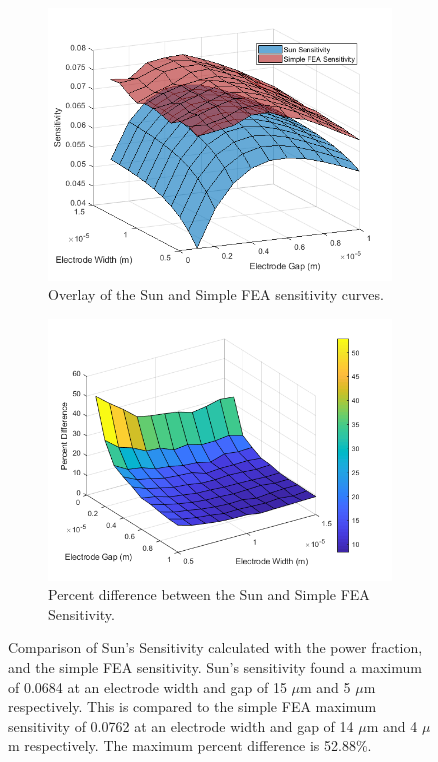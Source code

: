 \begin{figure}[h]
    \centering
    \begin{subfigure}{0.47\textwidth}
        \centering
        \includegraphics[width=\textwidth]{images/SunVsSimpleSensitivity.png}
        \caption{Overlay of the Sun and Simple FEA sensitivity curves.}
    \end{subfigure}
    \hfill
    \begin{subfigure}{0.47\textwidth}
        \centering
        \includegraphics[width=\textwidth]{images/SunVsSimplePercentDiff.png}
        \caption{Percent difference between the Sun and Simple FEA Sensitivity.}
    \end{subfigure}
    \caption[omparison of Sun's Sensitivity calculated with the power fraction, and the simple FEA sensitivity.]{Comparison of Sun's Sensitivity calculated with the power fraction, and the simple FEA sensitivity. Sun's sensitivity found a maximum of 0.0684 at an electrode width and gap of 15 $\mu$m and 5 $\mu$m respectively. This is compared to the simple FEA maximum sensitivity of 0.0762 at an electrode width and gap of 14 $\mu$m and 4 $\mu$m respectively. The maximum percent difference is 52.88\%.}
    \label{fig:sunVsSimpleSensitivity}
\end{figure}

